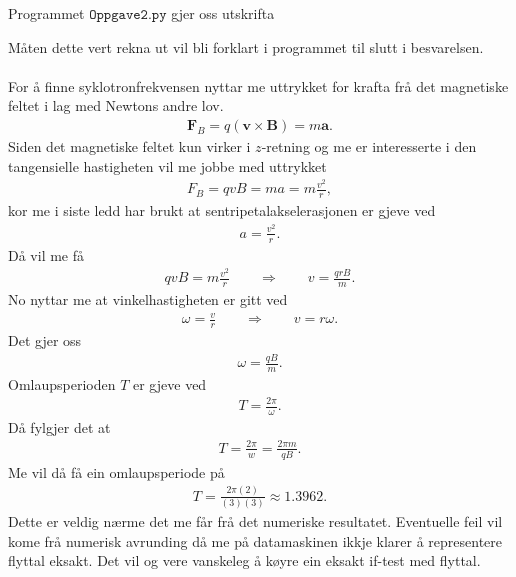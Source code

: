 \documentclass[11pt, a4paper]{article}
\begin{document}
  Programmet $\texttt{Oppgave2.py}$ gjer oss utskrifta
  \begin{center}
    
  \end{center}
  Måten dette vert rekna ut vil bli forklart i programmet til slutt i besvarelsen. \\ \\

  For å finne syklotronfrekvensen nyttar me uttrykket for krafta frå det magnetiske feltet i lag med Newtons andre lov.
  \begin{align*}
    \mathbf{F}_B = q\left( \mathbf{v} \times \mathbf{B} \right) = m\mathbf{a}.
  \end{align*}
  Siden det magnetiske feltet kun virker i $z$-retning og me er interesserte i den tangensielle hastigheten vil me jobbe med uttrykket
  \begin{align*}
    F_B = qvB = ma = m\frac{v^2}{r},
  \end{align*}
  kor me i siste ledd har brukt at sentripetalakselerasjonen er gjeve ved
  \begin{align*}
    a = \frac{v^2}{r}.
  \end{align*}
  Då vil me få
  \begin{align*}
    qvB = m\frac{v^2}{r} \qquad \Rightarrow \qquad v = \frac{qrB}{m}.
  \end{align*}
  No nyttar me at vinkelhastigheten er gitt ved 
  \begin{align*}
    \omega = \frac{v}{r} \qquad \Rightarrow \qquad v = r\omega.
  \end{align*}
  Det gjer oss
  \begin{align*}
    \omega = \frac{qB}{m}.
  \end{align*}
  Omlaupsperioden $T$ er gjeve ved 
  \begin{align*}
    T = \frac{2\pi}{\omega}.
  \end{align*}
  Då fylgjer det at
  \begin{align*}
    T = \frac{2\pi}{w} = \frac{2\pi m}{qB}.
  \end{align*}
  Me vil då få ein omlaupsperiode på 
  \begin{align*}
    T = \frac{2\pi (2)}{(3)(3)} \approx 1.3962.
  \end{align*}
  Dette er veldig nærme det me får frå det numeriske resultatet. Eventuelle feil vil kome frå numerisk avrunding då me på datamaskinen ikkje klarer å representere flyttal eksakt. Det vil 
  og vere vanskeleg å køyre ein eksakt if-test med flyttal.
\end{document}

